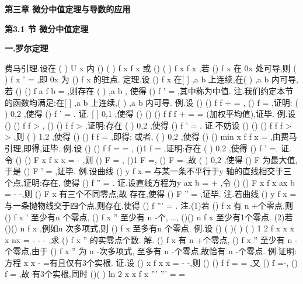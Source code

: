 \begin{center}
{\Large \bfseries \textcolor{lyred}{第三章 微分中值定理与导数的应用}}
\end{center}

\vspace{6pt}
{\large \bfseries \textcolor{lyred}{第3.1 节 微分中值定理}}

\vspace{4pt}
{\bfseries \textcolor{lyred}{一.罗尔定理}}

\textcolor{lyred}{费马引理}.设在
(
)
U x
内
()
(
)
f x
f x
\le 
或
()
(
)
f x
f x
\ge 
,若
()
f x 在
0x 处可导,则 
(
)
f
x
'
=
,即
0x 为
()
f x 的\textcolor{lyred}{驻点}. 
\textcolor{lyred}{定理}.设
()
f x 在[
]
,a b 上连续,在(
)
,a b 内可导,若
()
()
f a
f b
=
,则存在
(
)
,a b
\psi \in 
, 
使得
()
f
\psi 
'
=
,其中\psi 称为\textcolor{lyred}{中值}. 
\textcolor{lyred}{注}.我们约定本节的函数均满足:在[
]
,a b 上连续,(
)
,a b 内可导. 
\textcolor{lyred}{例}.设
()
()
f
f
+
=
,
()
f
=
,证明:
(
)
0,2
\psi 
\exists \in 
,使得
()
f
\psi 
'
=
. 
证.
[
]
0,1
\eta 
\exists \in 
,使得
()
()
()
f
f
f \eta 
+
=
=
(加权平均值),证毕. 
\textcolor{lyred}{例}.设
()
()
f
f
>
,
()
()
f
f
>
,证明:存在
(
)
0,2
\psi \in 
,使得
()
f
\psi 
'
=
. 
证.不妨设
()
()
()
f
f
f
>
>
,则
(
)
1,2
\eta 
\exists \in 
,使得
()
()
f
f
\eta =
,即得; 
或者,
(
)
0,2
\psi 
\exists \in 
,使得
()
()
min
x
f
f x
\psi 
\le \le 
=
,由费马引理,即得,证毕. 
\textcolor{lyred}{例}.设
()
()
f
f
=
=
,
()1
f
=
,证明:存在
(
)
0,2
\psi \in 
,使得
()
f
\psi 
'
=. 
证.令
()
()
F x
f x
x
=
-
,则
()
F
=
,
()1
F
=,
()
F
=-,故
(
)
0,2
\psi 
\exists \in 
,使得 
()
F \psi 为最大值,于是
()
F \psi 
'
=
,证毕. 
\textcolor{lyred}{例}.设曲线
()
y
f x
=
与某一条不平行于y 轴的直线相交于三个点,证明:存在\psi , 
使得
()
f
\psi 
''
=
. 
证.设直线方程为y
ax
b
=
+
,令
()
()
F x
f x
ax
b
=
-
-,则
()
F x 有三个不同零点,故 
存在\psi ,使得
()
F
\psi 
''
=
,证毕. 
\textcolor{lyred}{注}.若曲线
()
y
f x
=
与一条抛物线交于四个点,则存在\psi ,使得
()
f
\psi 
'''
=
. 
\textcolor{lyred}{注}.(1)若
()
f x 有
n +个零点,则
()
f
x
'
至少有n 个零点,
()
f
x
''
至少有
n -个, 
…,
()()
n
f
x 至少有1个零点. 
(2)若
()()
n
f
x \neq 
,例如n 次多项式,则
()
f x 至多有n 个零点. 
\textcolor{lyred}{例}.设
()
(
)(
)
(
)
1 2
f x
x x
x
nx
=
-
-
-
\Lambda 
,求
()
f
x
''
的实零点个数. 
解.
()
f x 有
n +个零点,
()
f
x
''
至少有
n -个零点,由于
()
f
x
''
为
n -次多项式, 
至多有
n -个零点,故恰有
n -个零点. 
\textcolor{lyred}{例}.证明:方程
x
x
-
=有且仅有3个实根. 
证.设
()
x
f x
x
=
-
-,则
()
()
f
f
=
=
,又
()
f
=-,
()
f
=
,故 
有3个实根,同时
()(
)
ln 2
x
x
f
x
'''
'''
=
=
\cdots 
